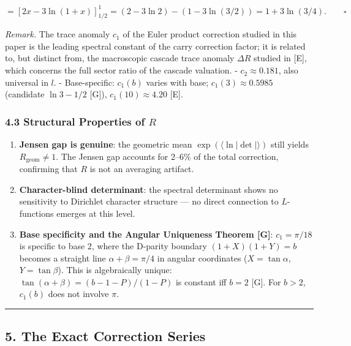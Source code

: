 \documentclass[
  11pt,
]{article}
\providecommand{\tightlist}{%
  \setlength{\itemsep}{0pt}\setlength{\parskip}{0pt}}
\begin{document}
\[= \left[2x - 3\ln(1+x)\right]_{1/2}^{1} = (2 - 3\ln 2) - (1 - 3\ln(3/2)) = 1 + 3\ln(3/4). \qquad\square\]

\emph{Remark.} The trace anomaly \(c_1\) of the Euler product correction studied
in this paper is the leading spectral constant of the carry correction factor;
it is related to, but distinct from, the macroscopic cascade trace anomaly
\(\Delta R\) studied in {[}E{]}, which concerns the full sector ratio of the
cascade valuation. - \(c_2 \approx 0.181\), also universal in \(l\). -
Base-specific: \(c_1(b)\) varies with base; \(c_1(3) \approx 0.5985\) (candidate
\(\ln 3 - 1/2\) {[}G{]}), \(c_1(10) \approx 4.20\) {[}E{]}.

\subsubsection{\texorpdfstring{4.3 Structural Properties of
\(R\)}{4.3 Structural Properties of R}}\label{structural-properties-of-r}

\begin{enumerate}
\def\labelenumi{\arabic{enumi}.}
\tightlist
\item
  \textbf{Jensen gap is genuine}: the geometric mean
  \(\exp(\langle\ln|\det|\rangle)\) still yields \(R_{\text{geom}} \neq 1\). The
  Jensen gap accounts for 2--6\% of the total correction, confirming that \(R\)
  is not an averaging artifact.
\item
  \textbf{Character-blind determinant}: the spectral determinant shows no
  sensitivity to Dirichlet character structure --- no direct connection to
  \(L\)-functions emerges at this level.
\item
  \textbf{Base specificity and the Angular Uniqueness Theorem {[}G{]}}:
  \(c_1 = \pi/18\) is specific to base 2, where the D-parity boundary
  \((1+X)(1+Y) = b\) becomes a straight line \(\alpha + \beta = \pi/4\) in
  angular coordinates (\(X = \tan\alpha\), \(Y = \tan\beta\)). This is
  algebraically unique: \(\tan(\alpha+\beta) = (b-1-P)/(1-P)\) is constant iff
  \(b = 2\) {[}G{]}. For \(b > 2\), \(c_1(b)\) does not involve \(\pi\).
\end{enumerate}

\begin{center}\rule{0.5\linewidth}{0.5pt}\end{center}

\newpage

\subsection{5. The Exact Correction Series}\label{the-exact-correction-series}
\end{document}
